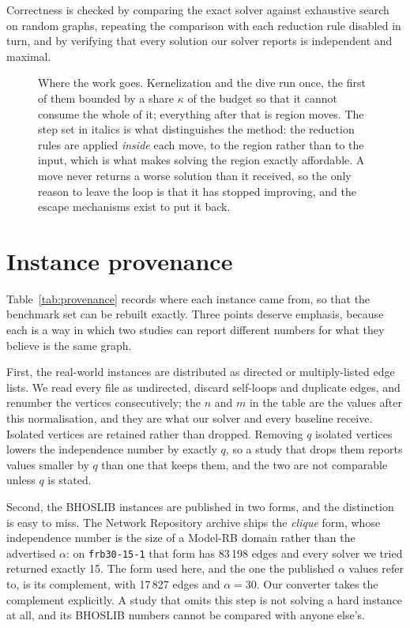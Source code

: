 \documentclass[preprint,authoryear,11pt]{elsarticle}
\theoremstyle{definition}
\begin{document}
Correctness is checked by comparing the exact solver against exhaustive search on
random graphs, repeating the comparison with each reduction rule disabled in
turn, and by verifying that every solution our solver reports is independent and maximal.


\begin{figure}[htbp]
\centering
\resizebox{\textwidth}{!}{}
\caption{Where the work goes. Kernelization and the dive run once, the first of
them bounded by a share $\kappa$ of the budget so that it cannot consume the
whole of it; everything after that is region moves. The
step set in italics is what distinguishes the method: the reduction rules are
applied \emph{inside} each move, to the region rather than to the input, which is
what makes solving the region exactly affordable. A move never returns a worse
solution than it received, so the only reason to leave the loop is that it has
stopped improving, and the escape mechanisms exist to put it back.}
\label{fig:pipeline}
\end{figure}
\section{Instance provenance}
\label{app:provenance}

Table~\ref{tab:provenance} records where each instance came from, so that the
benchmark set can be rebuilt exactly. Three points deserve emphasis, because each
is a way in which two studies can report different numbers for what they believe
is the same graph.

First, the real-world instances are distributed as directed or multiply-listed
edge lists. We read every file as undirected, discard self-loops and duplicate
edges, and renumber the vertices consecutively; the $n$ and $m$ in the table are
the values after this normalisation, and they are what our solver and every
baseline receive. Isolated vertices are retained rather than dropped. Removing $q$ isolated
vertices lowers the independence number by exactly $q$, so a study that drops
them reports values smaller by $q$ than one that keeps them, and the two are not
comparable unless $q$ is stated.

Second, the BHOSLIB instances are published in two forms, and the distinction is
easy to miss. The Network Repository archive ships the \emph{clique} form, whose
independence number is the size of a Model-RB domain rather than the advertised
$\alpha$: on \texttt{frb30-15-1} that form has 83\,198 edges and every solver we
tried returned exactly 15. The form used here, and the one the published
$\alpha$ values refer to, is its complement, with 17\,827 edges and $\alpha=30$.
Our converter takes the complement explicitly. A study that omits this step is
not solving a hard instance at all, and its BHOSLIB numbers cannot be compared
with anyone else's.
\end{document}
